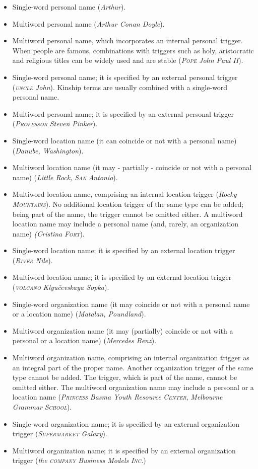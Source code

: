 \documentclass[output=paper]{langsci/langscibook}
\newcommand{\trigger}[1]{\textsc{#1}}
\begin{document}
\begin{itemize}
\item Single-word personal name (\textit{Arthur}).
\item Multiword personal name (\textit{Arthur Conan Doyle}).
\item Multiword personal name, which incorporates an internal personal
trigger. When people are famous, combinations with triggers such as
holy, aristocratic and religious titles can be widely used and are stable
(\textit{\trigger{Pope}} \textit{John Paul II}).
\item Single-word personal name; it is specified by an external personal trigger
(\textit{\trigger{uncle}} \textit{John}). Kinship terms are usually
combined with a single-word personal name.
\item Multiword personal name; it is specified by an external personal trigger
(\textit{\trigger{Professor}} \textit{Steven Pinker}).
\item Single-word location name (it can coincide or not with a personal name)
(\textit{Danube, Washington}).
\item Multiword location name (it may - partially -  coincide or not with a
personal name) (\textit{Little Rock, }\textit{\trigger{San}}\textit{
Antonio}).
\item Multiword location name, comprising an internal location trigger
(\textit{Rocky }\textit{\trigger{Mountains}}). No additional location
trigger of the same type can be added; being part of the name, the
trigger cannot be omitted either. A multiword location name may include
a personal name (and, rarely, an organization name) \textit{(Cristina
}\textit{\trigger{Fort}}).
\item Single-word location name; it is specified by an external location trigger
(\textit{\trigger{River}} \textit{Nile}).
\item Multiword location name; it is specified by an external location trigger
(\textit{\trigger{volcano}} \textit{Klyučevskaya Sopka}).
\item Single-word organization name (it may coincide or not with a personal
name or a location name) (\textit{Matalan, Poundland}).
\item Multiword organization name (it may (partially) coincide or not with a
personal or a location name) (\textit{Mercedes Benz}).
\item Multiword organization name, comprising an internal organization trigger
as an integral part of the proper name. Another organization trigger of
the same type cannot be added. The trigger, which is part of the name,
cannot be omitted either. The multiword organization name may include a
personal or a location name (\textit{\trigger{Princess}}\textit{ Basma
Youth Resource }\textit{\trigger{Center}}, \textit{Melbourne Grammar
}\textit{\trigger{School}}).
\item Single-word organization name; it is specified by an external organization
trigger (\textit{\trigger{Supermarket}}\textit{ Galaxy}).
\item Multiword organization name; it is specified by an external organization
trigger (\textit{the }\textit{\trigger{company}} \textit{Business Models
}\textit{\trigger{Inc.}})
\end{itemize}
\end{document}
